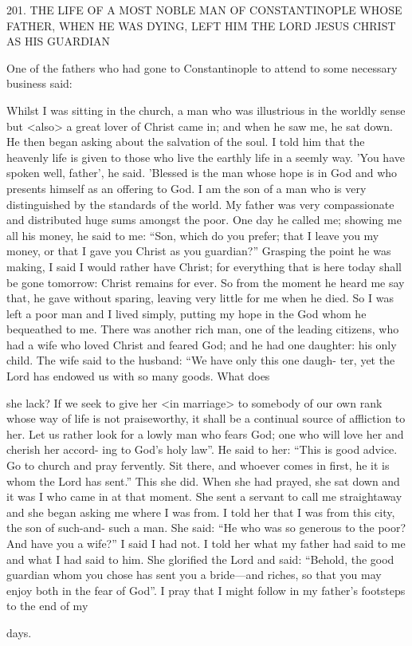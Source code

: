201. THE LIFE OF A MOST NOBLE MAN
OF CONSTANTINOPLE WHOSE FATHER,
WHEN HE WAS DYING, LEFT HIM
THE LORD JESUS CHRIST AS HIS GUARDIAN

One of the fathers who had gone to Constantinople to attend to
some necessary business said:

Whilst I was sitting in the church, a man who was illustrious in the
worldly sense but <also> a great lover of Christ came in; and when
he saw me, he sat down. He then began asking about the salvation
of the soul. I told him that the heavenly life is given to those who
live the earthly life in a seemly way. 'You have spoken well, father',
he said. 'Blessed is the man whose hope is in God and who presents
himself as an offering to God. I am the son of a man who is very
distinguished by the standards of the world. My father was very
compassionate and distributed huge sums amongst the poor. One
day he called me; showing me all his money, he said to me: “Son,
which do you prefer; that I leave you my money, or that I gave you
Christ as you guardian?” Grasping the point he was making, I said
I would rather have Christ; for everything that is here today shall
be gone tomorrow: Christ remains for ever. So from the moment he
heard me say that, he gave without sparing, leaving very little for
me when he died. So I was left a poor man and I lived simply,
putting my hope in the God whom he bequeathed to me. There was
another rich man, one of the leading citizens, who had a wife who
loved Christ and feared God; and he had one daughter: his only
child. The wife said to the husband: “We have only this one daugh-
ter, yet the Lord has endowed us with so many goods. What does

she lack? If we seek to give her <in marriage> to somebody of our
own rank whose way of life is not praiseworthy, it shall be a
continual source of affliction to her. Let us rather look for a lowly
man who fears God; one who will love her and cherish her accord-
ing to God's holy law”. He said to her: “This is good advice. Go to
church and pray fervently. Sit there, and whoever comes in first, he
it is whom the Lord has sent.” This she did. When she had prayed,
she sat down and it was I who came in at that moment. She sent a
servant to call me straightaway and she began asking me where I
was from. I told her that I was from this city, the son of such-and-
such a man. She said: “He who was so generous to the poor? And
have you a wife?” I said I had not. I told her what my father had
said to me and what I had said to him. She glorified the Lord and
said: “Behold, the good guardian whom you chose has sent you a
bride—and riches, so that you may enjoy both in the fear of God”.
I pray that I might follow in my father's footsteps to the end of my

days.

